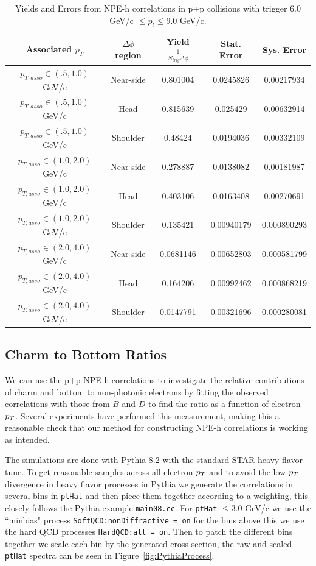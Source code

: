 \begin{table}
\centering
\begin{tabular}{|c|c|c|c|c|}
\hline
Associated $p_T$	& $\Delta\phi$ region & Yield $\frac{1}{N_{trig} \Delta\phi}$ & Stat. Error & Sys. Error\\
\hline
$p_{T,asso} \in(.5, 1.0)$ GeV/c  & Near-side  & 0.801004 & 0.0245826 & 0.00217934 \\
\hline
$p_{T,asso} \in(.5, 1.0)$ GeV/c  & Head  & 0.815639 & 0.025429 & 0.00632914 \\
\hline
$p_{T,asso} \in(.5, 1.0)$ GeV/c  & Shoulder & 0.48424 & 0.0194036 & 0.00332109 \\
\hline
$p_{T,asso} \in(1.0, 2.0)$ GeV/c  & Near-side & 0.278887 & 0.0138082 & 0.00181987 \\
\hline
$p_{T,asso} \in(1.0, 2.0)$ GeV/c  & Head & 0.403106 & 0.0163408 & 0.00270691 \\
\hline
$p_{T,asso} \in(1.0, 2.0)$ GeV/c  & Shoulder & 0.135421 & 0.00940179 & 0.000890293 \\
\hline
$p_{T,asso} \in(2.0, 4.0)$ GeV/c  & Near-side & 0.0681146 & 0.00652803 & 0.000581799 \\
\hline
$p_{T,asso} \in(2.0, 4.0)$ GeV/c  & Head & 0.164206 & 0.00992462 & 0.000868219 \\
\hline
$p_{T,asso} \in(2.0, 4.0)$ GeV/c  & Shoulder & 0.0147791 & 0.00321696 & 0.000280081 \\
\hline
\end{tabular}
\caption[Yields and Errors in p+p Correlations, High Trigger]{Yields and Errors from NPE-h correlations in p+p collisions with trigger $6.0 $GeV/c $\leq p_t \leq 9.0$ GeV/c.}
\label{tab:ppyieldhigh}
\end{table} 

\subsection{Charm to Bottom Ratios}

We can use the p+p NPE-h correlations to investigate the relative contributions of charm and bottom to non-photonic electrons by fitting the observed correlations with those from $B$ and $D$ to find the ratio as a function of electron $p_{T}$. Several experiments have performed this measurement, making this a reasonable check that our method for constructing NPE-h correlations is working as intended. 

The simulations are done with Pythia 8.2 with the standard STAR heavy flavor tune. To get reasonable samples across all electron $p_{T}$ and to avoid the low $p_{T}$ divergence in heavy flavor processes in Pythia we generate the correlations in several bins in \texttt{ptHat} and then piece them together according to a weighting, this closely follows the Pythia example \texttt{main08.cc}. For \texttt{ptHat} $\leq 3.0$ GeV/c we use the ``minbias" process \texttt{SoftQCD:nonDiffractive = on} for the bins above this we use the hard QCD processes \texttt{HardQCD:all = on}. Then to patch the different bins together we scale each bin by the generated cross section, the raw and scaled \texttt{ptHat} spectra can be seen in Figure~\ref{fig:PythiaProcess}.   

